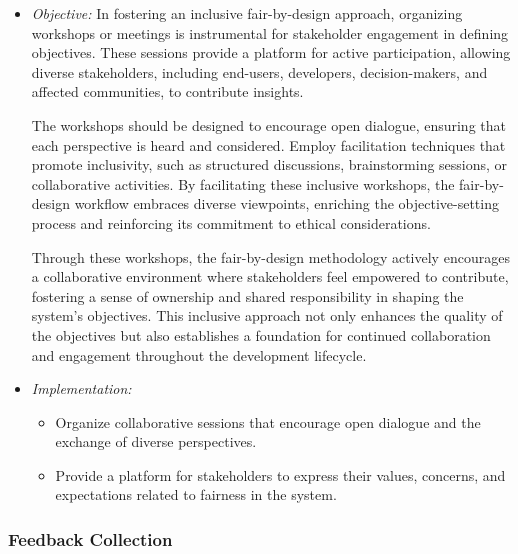 \documentclass[12pt,a4paper,openright,twoside]{book}
\begin{document}
\begin{itemize}

    \item \emph{Objective:} In fostering an inclusive fair-by-design approach, organizing workshops or meetings is instrumental for stakeholder engagement in defining objectives. These sessions provide a platform for active participation, allowing diverse stakeholders, including end-users, developers, decision-makers, and affected communities, to contribute insights.

    The workshops should be designed to encourage open dialogue, ensuring that each perspective is heard and considered. Employ facilitation techniques that promote inclusivity, such as structured discussions, brainstorming sessions, or collaborative activities. By facilitating these inclusive workshops, the fair-by-design workflow embraces diverse viewpoints, enriching the objective-setting process and reinforcing its commitment to ethical considerations.
    
    Through these workshops, the fair-by-design methodology actively encourages a collaborative environment where stakeholders feel empowered to contribute, fostering a sense of ownership and shared responsibility in shaping the system's objectives. This inclusive approach not only enhances the quality of the objectives but also establishes a foundation for continued collaboration and engagement throughout the development lifecycle.

    \item \emph{Implementation:}

    \begin{itemize}

        \item Organize collaborative sessions that encourage open dialogue and the exchange of diverse perspectives.

        \item Provide a platform for stakeholders to express their values, concerns, and expectations related to fairness in the system.

    \end{itemize}

\end{itemize}

\subsubsection{Feedback Collection}
\end{document}
